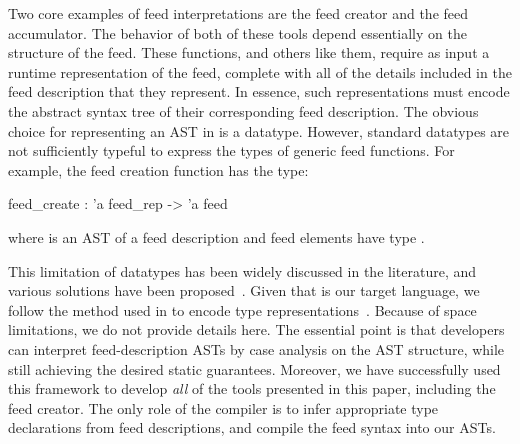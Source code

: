 Two core examples of feed interpretations are the feed creator and the feed accumulator. The behavior of both of these tools depend essentially on the structure of the feed. These functions, and others like them, require as input a runtime representation of the feed, complete with all of the details included in the feed description that they represent. In essence, such representations must encode the abstract syntax tree of their corresponding feed description. The obvious choice for representing an AST in \ocaml is a datatype. However, standard \ocaml datatypes are not sufficiently typeful to express the types of generic feed functions. For example, the feed creation function has the type: 
\begin{code}
feed_create : 'a feed_rep -> 'a feed
\end{code} 
where  is an AST of a feed description and feed elements have type .


This limitation of datatypes has been widely discussed in the literature, and various solutions have been proposed~\cite{various, our-padl-paper}. Given that \ocaml is our target language, we follow the method used in \padsml{} to encode type representations~\cite{padsml-padl}. Because of space limitations, we do not provide details here.  The essential point is that developers can interpret feed-description ASTs by case analysis on the AST structure, while still achieving the desired static guarantees. Moreover, we have successfully used this framework to develop {\it all} of the tools presented in this paper, including the feed creator. The only role of the compiler is to infer appropriate type declarations from feed descriptions, and compile the feed syntax into our ASTs.

